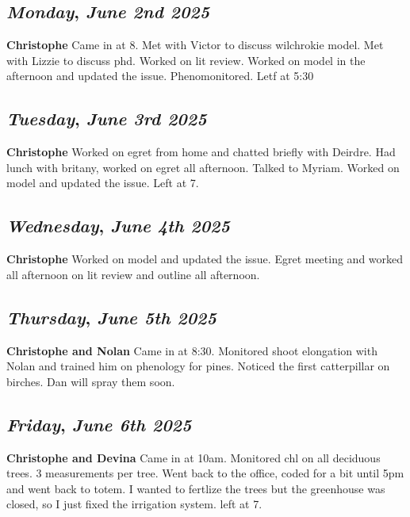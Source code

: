 \begin{center}
\section*{\month}
\end{center}

\def\day{\textit{June 2nd 2025}}
\def\weekday{\textit{Monday}}
\subsection*{\weekday, \day}
\textbf {Christophe}
Came in at 8. Met with Victor to discuss wilchrokie model. Met with Lizzie to discuss phd. Worked on lit review. Worked on model in the afternoon and updated the issue. Phenomonitored. Letf at 5:30

\def\day{\textit{June 3rd 2025}}
\def\weekday{\textit{Tuesday}}
\subsection*{\weekday, \day}
\textbf {Christophe}
Worked on egret from home and chatted briefly with Deirdre. Had lunch with britany, worked on egret all afternoon. Talked to Myriam. Worked on model and updated the issue. Left at 7.

\def\day{\textit{June 4th 2025}}
\def\weekday{\textit{Wednesday}}
\subsection*{\weekday, \day}
\textbf {Christophe}
Worked on model and updated the issue. Egret meeting and worked all afternoon on lit review and outline all afternoon.

\def\day{\textit{June 5th 2025}}
\def\weekday{\textit{Thursday}}
\subsection*{\weekday, \day}
\textbf {Christophe and Nolan}
Came in at 8:30. Monitored shoot elongation with Nolan and trained him on phenology for pines. Noticed the first catterpillar on birches. Dan will spray them soon.

\def\day{\textit{June 6th 2025}}
\def\weekday{\textit{Friday}}
\subsection*{\weekday, \day}
\textbf {Christophe and Devina}
Came in at 10am. Monitored chl on all deciduous trees. 3 measurements per tree. Went back to the office, coded for a bit until 5pm and went back to totem. I wanted to fertlize the trees but the greenhouse was closed, so I just fixed the irrigation system. left at 7.

